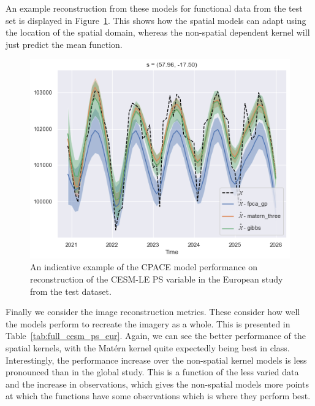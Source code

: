An example reconstruction from these models for functional data from the test set is displayed in Figure~\ref{fig:test_ex_ps_eur}. 
This shows how the spatial models can adapt using the location of the spatial domain, whereas the non-spatial dependent kernel will just predict the mean function.

\begin{figure}
	\centering
	\includegraphics[width=\textwidth]{test_ex_ps_eur}
	\caption[An indicative example of the CPACE model performance on reconstruction of the CESM-LE PS variable in the European study from the test dataset.]{An indicative example of the CPACE model performance on reconstruction of the CESM-LE PS variable in the European study from the test dataset.}
	\label{fig:test_ex_ps_eur}
\end{figure}

Finally we consider the image reconstruction metrics.
These consider how well the models perform to recreate the imagery as a whole. 
This is presented in Table~\ref{tab:full_cesm_ps_eur}.
Again, we can see the better performance of the spatial kernels, with the Mat\'ern kernel quite expectedly being best in class.
Interestingly, the performance increase over the non-spatial kernel models is less pronounced than in the global study.
This is a function of the less varied data and the increase in observations, which gives the non-spatial models more points at which the functions have some observations which is where they perform best.

